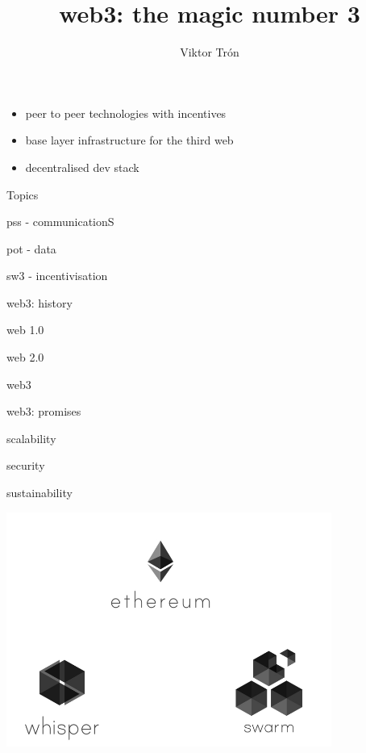 \documentclass{beamer}
\title{web3: the magic number 3}
\author{Viktor Trón}
\begin{document}
\begin{frame}
 \titlepage
\end{frame}

\begin{frame}
\begin{block}{}
\begin{itemize}
\item peer to peer technologies with incentives
\item base layer infrastructure for the third web
\item decentralised dev stack
\end{itemize}
\end{block}
\end{frame}


\begin{frame}{Topics}
\begin{block}{}
pss - communicationS
\end{block}
\begin{block}{}
pot - data
\end{block}
\begin{block}{}
sw3 - incentivisation
\end{block}
\end{frame}

\begin{frame}{web3: history}
\begin{block}{}
web 1.0
\end{block}
\begin{block}{}
web 2.0
\end{block}
\begin{block}{}
web3
\end{block}
\end{frame}

\begin{frame}{web3: promises}
\begin{block}{}
scalability
\end{block}
\begin{block}{}
security
\end{block}
\begin{block}{}
sustainability
\end{block}
\end{frame}

\begin{frame}[plain,c]
\begin{center}
\includegraphics[width=0.8\textwidth]{ecosystem0.jpg}
\end{center}
\end{frame}
\end{document}
